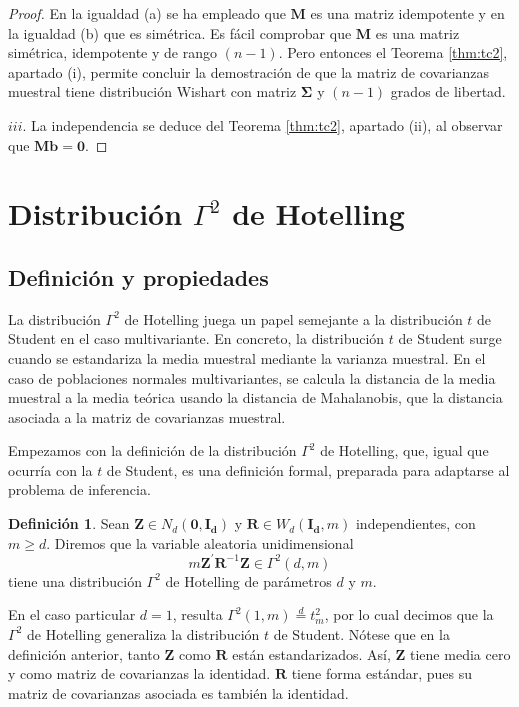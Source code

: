 \documentclass[
  a4paper,
  oneside]{scrbook}
\theoremstyle{definition}
\newtheorem{definition}{Definición}[chapter]
\theoremstyle{definition}
\theoremstyle{definition}
\theoremstyle{definition}
\theoremstyle{remark}
\begin{document}
\begin{proof}
En la igualdad (a) se ha empleado que \(\bm{M}\) es una matriz idempotente
y en la igualdad (b) que es simétrica. Es fácil comprobar que \(\bm{M}\)
es una matriz simétrica, idempotente y de rango \((n-1)\). Pero entonces
el Teorema \ref{thm:tc2},
apartado (i), permite concluir la demostración de que la matriz de
covarianzas muestral tiene distribución Wishart con matriz \(\bm\Sigma\) y
\((n-1)\) grados de libertad.

\(iii.\) La independencia se deduce del Teorema \ref{thm:tc2}, apartado (ii), al
observar que \(\bm{M}\bm{b}=\bm{0}\).
\end{proof}

\section{\texorpdfstring{Distribución \(\Gamma^2\) de Hotelling}{Distribución \textbackslash Gamma\^{}2 de Hotelling}}\label{distribucion-gamma-2-de-hotelling}

\subsection{Definición y propiedades}\label{definicion-y-propiedades-2}

La distribución \(\Gamma^2\) de Hotelling juega un papel semejante a la
distribución \(t\) de Student en el caso multivariante. En concreto, la
distribución \(t\) de Student surge cuando se estandariza la media
muestral mediante la varianza muestral. En el caso de poblaciones
normales multivariantes, se calcula la distancia de la media muestral a
la media teórica usando la distancia de Mahalanobis, que la distancia
asociada a la matriz de covarianzas muestral.

Empezamos con la definición de la distribución \(\Gamma^2\) de Hotelling,
que, igual que ocurría con la \(t\) de Student, es una definición formal,
preparada para adaptarse al problema de inferencia.

\begin{definition}
\protect\hypertarget{def:unnamed-chunk-104}{}\label{def:unnamed-chunk-104}Sean \(\bm{Z}\in N_d(\bm{0},\bm{I_d})\) y \(\bm{R}\in W_d(\bm{I_d},m)\)
independientes, con \(m\geq d\). Diremos que la variable aleatoria
unidimensional \[m\bm{Z}^{\prime} \bm{R}^{-1} \bm{Z} \in \Gamma^2(d,m)\]
tiene una distribución \(\Gamma^2\) de Hotelling de parámetros \(d\) y \(m\).
\end{definition}

En el caso particular \(d=1\), resulta
\(\Gamma^2(1,m)\stackrel{d}{=}t_{m}^2\), por lo cual decimos que la
\(\Gamma^2\) de Hotelling generaliza la distribución \(t\) de Student.
Nótese que en la definición anterior, tanto \(\bm{Z}\) como \(\bm{R}\) están
estandarizados. Así, \(\bm{Z}\) tiene media cero y como matriz de
covarianzas la identidad. \(\bm{R}\) tiene forma estándar, pues su matriz
de covarianzas asociada es también la identidad.
\end{document}

